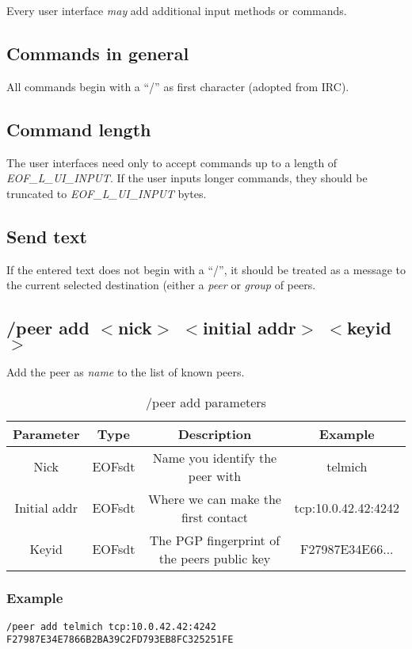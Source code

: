 \documentclass[12pt,a4paper]{book}
\begin{document}
Every user interface \emph{may} add additional input methods or commands.
\subsection{Commands in general}
All commands begin with a "`/"' as first character (adopted from IRC).
\subsection{Command length}
The user interfaces need only to accept commands up to a length of
\emph{EOF\_L\_UI\_INPUT}.
If the user inputs longer commands, they should be truncated
to \emph{EOF\_L\_UI\_INPUT} bytes.
\subsection{Send text}
If the entered text does not begin with a "`/"', it should be treated
as a message to the current selected destination (either
a \emph{peer} or \emph{group} of peers.
\subsection{/peer add $<$nick$>$ $<$initial addr$>$ $<$keyid$>$}
Add the peer as \textit{name} to the list of known peers.

%
\begin{longtable}{|c|c|c|c|}
\caption{/peer add parameters}\\
\hline
\textbf{Parameter} & \textbf{Type} & \textbf{Description} & \textbf{Example}\\
\hline
Nick & EOFsdt & Name you identify the peer with & telmich\\
\hline
Initial addr & EOFsdt & Where we can make the first contact & tcp:10.0.42.42:4242\\
\hline
Keyid & EOFsdt & The PGP fingerprint of the peers public key & F27987E34E66...\\
\hline
\end{longtable}

\subsubsection{Example}
\begin{verbatim}
/peer add telmich tcp:10.0.42.42:4242 F27987E34E7866B2BA39C2FD793EB8FC325251FE
\end{verbatim}
\end{document}
